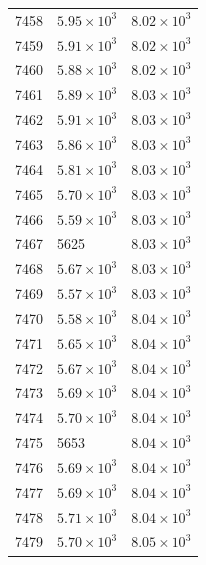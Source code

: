 \begin{table}[H]
\begin{tabular}{lll}
7458 & $\displaystyle 5.95 \times 10^{3}$ & $\displaystyle 8.02 \times 10^{3}$ \\
7459 & $\displaystyle 5.91 \times 10^{3}$ & $\displaystyle 8.02 \times 10^{3}$ \\
7460 & $\displaystyle 5.88 \times 10^{3}$ & $\displaystyle 8.02 \times 10^{3}$ \\
7461 & $\displaystyle 5.89 \times 10^{3}$ & $\displaystyle 8.03 \times 10^{3}$ \\
7462 & $\displaystyle 5.91 \times 10^{3}$ & $\displaystyle 8.03 \times 10^{3}$ \\
7463 & $\displaystyle 5.86 \times 10^{3}$ & $\displaystyle 8.03 \times 10^{3}$ \\
7464 & $\displaystyle 5.81 \times 10^{3}$ & $\displaystyle 8.03 \times 10^{3}$ \\
7465 & $\displaystyle 5.70 \times 10^{3}$ & $\displaystyle 8.03 \times 10^{3}$ \\
7466 & $\displaystyle 5.59 \times 10^{3}$ & $\displaystyle 8.03 \times 10^{3}$ \\
7467 & 5625 & $\displaystyle 8.03 \times 10^{3}$ \\
7468 & $\displaystyle 5.67 \times 10^{3}$ & $\displaystyle 8.03 \times 10^{3}$ \\
7469 & $\displaystyle 5.57 \times 10^{3}$ & $\displaystyle 8.03 \times 10^{3}$ \\
7470 & $\displaystyle 5.58 \times 10^{3}$ & $\displaystyle 8.04 \times 10^{3}$ \\
7471 & $\displaystyle 5.65 \times 10^{3}$ & $\displaystyle 8.04 \times 10^{3}$ \\
7472 & $\displaystyle 5.67 \times 10^{3}$ & $\displaystyle 8.04 \times 10^{3}$ \\
7473 & $\displaystyle 5.69 \times 10^{3}$ & $\displaystyle 8.04 \times 10^{3}$ \\
7474 & $\displaystyle 5.70 \times 10^{3}$ & $\displaystyle 8.04 \times 10^{3}$ \\
7475 & 5653 & $\displaystyle 8.04 \times 10^{3}$ \\
7476 & $\displaystyle 5.69 \times 10^{3}$ & $\displaystyle 8.04 \times 10^{3}$ \\
7477 & $\displaystyle 5.69 \times 10^{3}$ & $\displaystyle 8.04 \times 10^{3}$ \\
7478 & $\displaystyle 5.71 \times 10^{3}$ & $\displaystyle 8.04 \times 10^{3}$ \\
7479 & $\displaystyle 5.70 \times 10^{3}$ & $\displaystyle 8.05 \times 10^{3}$ \\

\end{tabular}
\end{table}
